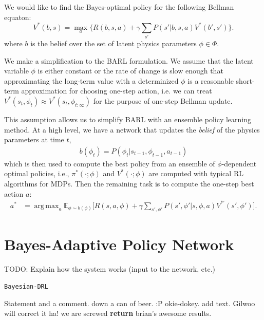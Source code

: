 \documentclass{article}
\DeclareMathOperator*{\argmax}{arg\,max}
\DeclareMathOperator*{\argmin}{arg\,min}
\begin{document}
We would like to find the Bayes-optimal policy for the following Bellman equaton:
\begin{equation}\label{eq:rl}
V^*(b, s) = \max_a \bigg\{R(b, s, a) + \gamma \sum_{s'}P(s'|b, s, a)V^*(b', s') \bigg\}.
\end{equation}
where $b$ is the belief over the set of latent physics parameters $\phi \in \Phi$.

We make a simplification to the BARL formulation. We assume that the latent variable $\phi$ is either constant or the rate of change is slow enough that approximating the long-term value with a determinized $\phi$ is a reasonable short-term approximation for choosing one-step action, i.e. we can treat $V^*(s_t, \phi_t) \approx V^*(s_t, \phi_{t:\infty})$ for the purpose of one-step Bellman update.

This assumption allows us to simplify BARL with an ensemble policy learning method. At a high level, we have a network that updates the \emph{belief} of the physics parameters at time $t$,
\begin{align*}
b(\phi_t) = P(\phi_t|s_{t-1}, \phi_{t-1}, a_{t-1})
\end{align*}
which is then used to compute the best policy from an ensemble of $\phi$-dependent optimal policies, i.e., $\pi^*(\cdot;\phi)$ and $V^*(\cdot;\phi)$ are computed with typical RL algorithms for MDPs. Then the remaining task is to compute the one-step best action $a$:
\begin{align}\label{eq:barl}
 a^* &= \argmax_{a} \mathbb{E}_{\phi \sim b(\phi)} \bigg[R(s, a, \phi) + \gamma \sum_{s', \phi'}P(s',\phi'|s, \phi, a)V^{*'}(s', \phi') \bigg].
\end{align}

\section{Bayes-Adaptive Policy Network}

TODO: Explain how the system works (input to the network, etc.)
%
%
\begin{algorithm}[tb]
\caption{\texttt{Bayesian-DRL}}
\label{alg:highLevel}	
\begin{algorithmic}[1]
\State Statement and a comment. 
\vspace{2mm}
  
	\State down a can of beer. :P
\EndFor
\State okie-dokey.
	\State add text.
		\State Gilwoo will correct it ha!
	\Else
		\State we are screwed
	\EndIf   		
\EndWhile
\State \textbf{return} brian's awesome results.
\end{algorithmic}
\end{algorithm}
\end{document}
